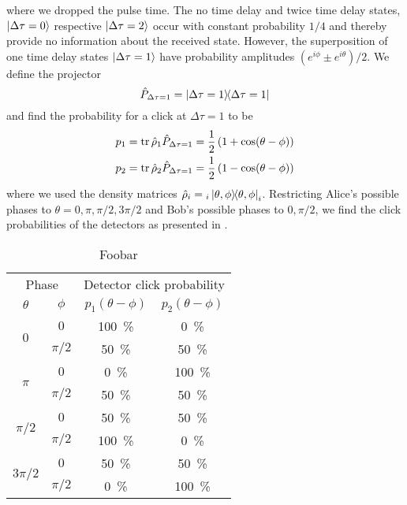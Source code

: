 where we dropped the pulse time.
The no time delay and twice time delay states, $\ket{\Delta\tau=0}$ respective $\ket{\Delta\tau=2}$ occur with constant probability $1/4$ and thereby provide no information about the received state.
However, the superposition of one time delay states $\ket{\Delta\tau=1}$ have probability amplitudes $(e^{i\phi}\pm e^{i\theta})/2$.
We define the projector
\begin{equation}
	\hat{P}_{\Delta\tau=1}
	=
	\ketbra{\Delta\tau=1}
\end{equation}
and find the probability for a click at $\Delta\tau=1$ to be
\begin{align}
	p_1
	&=
	\trace{\hat\rho_1\hat{P}_{\Delta\tau=1}}
	=
	\frac{1}{2}
	\left(1+\cos(\theta-\phi)\right)
	\\
	p_2
	&=
	\trace{\hat\rho_2\hat{P}_{\Delta\tau=1}}
	=
	\frac{1}{2}
	\left(1-\cos(\theta-\phi)\right)
\end{align}
where we used the density matrices $\hat\rho_i={}_i\ketbra{\theta,\phi}_i$.
Restricting Alice's possible phases to $\theta=0,\pi,\pi/2,3\pi/2$ and Bob's possible phases to $0,\pi/2$, we find the click probabilities of the detectors as presented in .
\begin{table}[htb]
	\centering
	\begin{tabular}{cccc}
		\toprule
		\multicolumn{2}{c}{Phase} & \multicolumn{2}{c}{Detector click probability} \\
		\cmidrule{1-2}
		\cmidrule{3-4}
		$\theta$ & $\phi$ & $p_1(\theta-\phi)$ & $p_2(\theta-\phi)$ \\
		\midrule
		\multirow{2}{*}{$0$} & $0$ & \SI{100}{\percent} & \SI{0}{\percent} \\
		& $\pi/2$ & \SI{50}{\percent} & \SI{50}{\percent} \\
		\cmidrule{1-2}
		\multirow{2}{*}{$\pi$} & $0$ & \SI{0}{\percent} & \SI{100}{\percent} \\
		& $\pi/2$ & \SI{50}{\percent} & \SI{50}{\percent} \\
		\cmidrule{1-2}
		\multirow{2}{*}{$\pi/2$} & $0$ & \SI{50}{\percent} & \SI{50}{\percent} \\
		& $\pi/2$ & \SI{100}{\percent} & \SI{0}{\percent} \\
		\cmidrule{1-2}
		\multirow{2}{*}{$3\pi/2$} & $0$ & \SI{50}{\percent} & \SI{50}{\percent} \\
		& $\pi/2$ & \SI{0}{\percent} & \SI{100}{\percent} \\
		\bottomrule
	\end{tabular}
	\caption{Foobar}\label{tab:qubit_time_phase_clicks}
\end{table}